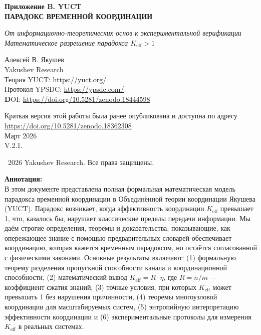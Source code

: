 \documentclass[12pt]{article}
\begin{document}
	\begin{titlepage}
		\begin{center}
			\vspace*{0cm}
			\Huge\textbf{Приложение B. YUCT\\
				ПАРАДОКС ВРЕМЕННОЙ КООРДИНАЦИИ}
			
			\vspace{0cm}
			\LARGE\textit{От информационно-теоретических основ к экспериментальной верификации \\
				Математическое разрешение парадокса $K_{\text{eff}} > 1$}
			
			\vspace{1cm}
			\Large
			Алексей В. Якушев\\
			Yakushev Research\\
			Теория YUCT: \url{https://yuct.org/}\\
			Протокол YPSDC: \url{https://ypsdc.com/}\\
			
			\vspace{2cm}
			\textbf DOI: \url{https://doi.org/10.5281/zenodo.18444598}\\
			
			\vspace{1cm}
			
			\vspace{0cm}
			\large 
			Краткая версия этой работы была ранее опубликована и доступна по адресу\\ \url{https://doi.org/10.5281/zenodo.18362308}\\
			\vspace{1cm}
			Март 2026 \\ \large V.2.1.
			
			\vspace{5cm}
			\textcopyright~2026 Yakushev Research. Все права защищены.
			
			\newpage
			\vfill
			\normalsize
			\begin{minipage}{0.8\textwidth}
				\centering
				\textbf{Аннотация:} \\ В этом документе представлена полная формальная математическая модель парадокса временной координации в Объединённой теории координации Якушева (YUCT). Парадокс возникает, когда эффективность координации $K_{\text{eff}}$ превышает 1, что, казалось бы, нарушает классические пределы передачи информации. Мы даём строгие определения, теоремы и доказательства, показывающие, как опережающее знание с помощью предварительных словарей обеспечивает координацию, которая кажется временным парадоксом, но остаётся согласованной с физическими законами. Основные результаты включают: (1) формальную теорему разделения пропускной способности канала и координационной способности, (2) математический вывод $K_{\text{eff}} = R \cdot \eta$, где $R = n/m$ — коэффициент сжатия знаний, (3) точные условия, при которых $K_{\text{eff}}$ может превышать 1 без нарушения причинности, (4) теоремы многоузловой координации для масштабируемых систем, (5) энтропийную интерпретацию эффективности координации и (6) экспериментальные протоколы для измерения $K_{\text{eff}}$ в реальных системах.
			\end{minipage}
			

\end{center}
\end{titlepage}
\end{document}
